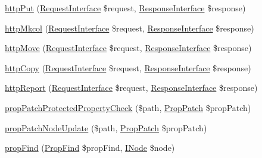 \begin{DoxyCompactItemize}
\item 
\mbox{\hyperlink{class_sabre_1_1_d_a_v_1_1_core_plugin_ad4cb72281b7ca08ef398c18589849888}{http\+Put}} (\mbox{\hyperlink{interface_sabre_1_1_h_t_t_p_1_1_request_interface}{Request\+Interface}} \$request, \mbox{\hyperlink{interface_sabre_1_1_h_t_t_p_1_1_response_interface}{Response\+Interface}} \$response)
\item 
\mbox{\hyperlink{class_sabre_1_1_d_a_v_1_1_core_plugin_a5edd91042a074558951f4a5c63a1de67}{http\+Mkcol}} (\mbox{\hyperlink{interface_sabre_1_1_h_t_t_p_1_1_request_interface}{Request\+Interface}} \$request, \mbox{\hyperlink{interface_sabre_1_1_h_t_t_p_1_1_response_interface}{Response\+Interface}} \$response)
\item 
\mbox{\hyperlink{class_sabre_1_1_d_a_v_1_1_core_plugin_a33e175c7fdeda806c3e27cea8c64f1a9}{http\+Move}} (\mbox{\hyperlink{interface_sabre_1_1_h_t_t_p_1_1_request_interface}{Request\+Interface}} \$request, \mbox{\hyperlink{interface_sabre_1_1_h_t_t_p_1_1_response_interface}{Response\+Interface}} \$response)
\item 
\mbox{\hyperlink{class_sabre_1_1_d_a_v_1_1_core_plugin_a0eed50d5ee6f742f0a9be9f6494b5d32}{http\+Copy}} (\mbox{\hyperlink{interface_sabre_1_1_h_t_t_p_1_1_request_interface}{Request\+Interface}} \$request, \mbox{\hyperlink{interface_sabre_1_1_h_t_t_p_1_1_response_interface}{Response\+Interface}} \$response)
\item 
\mbox{\hyperlink{class_sabre_1_1_d_a_v_1_1_core_plugin_a54e5b3fe8a4a6a1ead2ffd5ccfdde1b3}{http\+Report}} (\mbox{\hyperlink{interface_sabre_1_1_h_t_t_p_1_1_request_interface}{Request\+Interface}} \$request, \mbox{\hyperlink{interface_sabre_1_1_h_t_t_p_1_1_response_interface}{Response\+Interface}} \$response)
\item 
\mbox{\hyperlink{class_sabre_1_1_d_a_v_1_1_core_plugin_ac49f639819402f637dde0299de61f283}{prop\+Patch\+Protected\+Property\+Check}} (\$path, \mbox{\hyperlink{class_sabre_1_1_d_a_v_1_1_prop_patch}{Prop\+Patch}} \$prop\+Patch)
\item 
\mbox{\hyperlink{class_sabre_1_1_d_a_v_1_1_core_plugin_a16b6b3bd0ea88a18c77a929427038394}{prop\+Patch\+Node\+Update}} (\$path, \mbox{\hyperlink{class_sabre_1_1_d_a_v_1_1_prop_patch}{Prop\+Patch}} \$prop\+Patch)
\item 
\mbox{\hyperlink{class_sabre_1_1_d_a_v_1_1_core_plugin_abdbc8acfaf7175d191847aab4f601c34}{prop\+Find}} (\mbox{\hyperlink{class_sabre_1_1_d_a_v_1_1_prop_find}{Prop\+Find}} \$prop\+Find, \mbox{\hyperlink{interface_sabre_1_1_d_a_v_1_1_i_node}{I\+Node}} \$node)

\end{DoxyCompactItemize}
